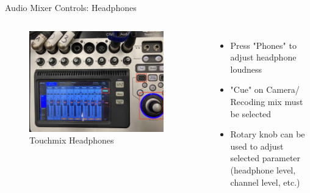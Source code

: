 \begin{frame}{Audio Mixer Controls: Headphones}
	\begin{columns}[T,onlytextwidth]
		\begin{figure} 
			\centering
			\includegraphics[width=0.9\textwidth]{images/touchmix-cam-headphones.jpg}
			\caption{Touchmix Headphones}
		\end{figure}
		\begin{itemize}
			\item Press "Phones" to adjust headphone loudness
			\item "Cue" on Camera/ Recoding mix must be selected
			\item Rotary knob can be used to adjust selected parameter (headphone level, channel level, etc.)
		\end{itemize}
	\end{columns}
\end{frame}
